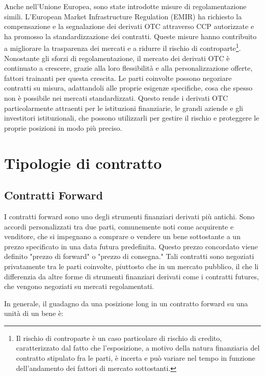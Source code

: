 \documentclass[12pt,a4paper]{report}
\begin{document}
Anche nell'Unione Europea, sono state introdotte misure di regolamentazione simili. L'European Market Infrastructure Regulation (EMIR) ha richiesto la compensazione e la segnalazione dei derivati OTC attraverso CCP autorizzate e ha promosso la standardizzazione dei contratti. Queste misure hanno contribuito a migliorare la trasparenza dei mercati e a ridurre il rischio di controparte\footnote{Il rischio di controparte è un caso particolare di rischio di credito, caratterizzato dal fatto che l'esposizione, a motivo della natura finanziaria del contratto stipulato fra le parti, è incerta e può variare nel tempo in funzione dell'andamento dei fattori di mercato sottostanti.}.
Nonostante gli sforzi di regolamentazione, il mercato dei derivati OTC è continuato a crescere, grazie alla loro flessibilità e alla personalizzazione offerte, fattori trainanti per questa crescita. Le parti coinvolte possono negoziare contratti su misura, adattandoli alle proprie esigenze specifiche, cosa che spesso non è possibile nei mercati standardizzati. Questo  rende i derivati OTC particolarmente attraenti per le istituzioni finanziarie, le grandi aziende e gli investitori istituzionali, che possono utilizzarli per gestire il rischio e proteggere le proprie posizioni in modo più preciso.

\section{Tipologie di contratto}



\subsection{Contratti Forward}

I contratti forward sono uno degli strumenti finanziari derivati più antichi. Sono accordi personalizzati tra due parti, comunemente noti come acquirente e venditore, che si impegnano a comprare o vendere un bene sottostante a un prezzo specificato in una data futura predefinita. Questo prezzo concordato viene definito "prezzo di forward" o "prezzo di consegna."
Tali contratti sono negoziati privatamente tra le parti coinvolte, piuttosto che in un mercato pubblico, il che li differenzia da altre forme di strumenti finanziari derivati come i contratti futures, che vengono negoziati su mercati regolamentati.

In generale, il guadagno da una posizione long in un contratto forward su una unità di un bene è: 
\end{document}

